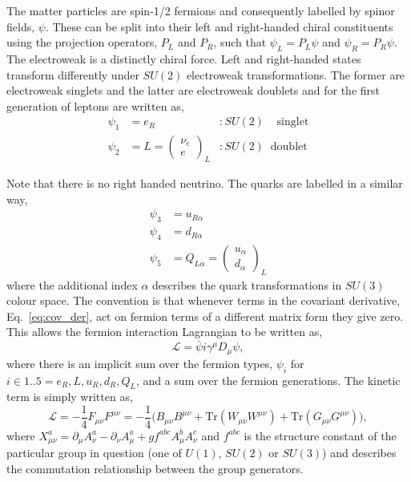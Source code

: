 The matter particles are spin-1/2 fermions and consequently labelled by spinor fields, $\psi$. These can be split into their left and right-handed chiral constituents using the projection operators, $P_{L}$ and $P_{R}$, such that $\psi_{L}=P_{L}\psi$ and $\psi_{R}=P_{R}\psi$.
The electroweak is a distinctly chiral force. Left and right-handed states transform differently under $SU(2)$ electroweak transformations. The former are electroweak singlets and the latter are electroweak doublets and for the first generation of leptons are written as,
\begin{align}
  \psi_{1} & = e_{R} &:SU(2)\;\;\;\;\mathrm{singlet} \\
  \psi_{2} & = L = \begin{pmatrix} \nu_{e} \\[-0.05cm] e \end{pmatrix}_{L} &:SU(2)\;\;\mathrm{doublet} 
\end{align}

Note that there is no right handed neutrino. The quarks are labelled in a similar way,
\begin{align}
  \psi_{3} & = u_{R\alpha} \\
  \psi_{4} & = d_{R\alpha} \\
  \psi_{5} & = Q_{L\alpha} = \begin{pmatrix} u_{\alpha} \\[-0.05cm] d_{\alpha} \end{pmatrix}_{L}  
\end{align}
where the additional index $\alpha$ describes the quark transformations in $SU(3)$ colour space. The convention is that whenever terms in the covariant derivative, Eq.~\ref{eq:cov_der}, act on fermion terms of a different matrix form they give zero. This allows the \SM fermion interaction Lagrangian to be written as,
\begin{equation}
  \mathcal{L} = \bar{\psi}i\gamma^{\mu}D_{\mu}\psi,
\end{equation}
where there is an implicit sum over the fermion types, $\psi_{i}$ for $i\in{1..5}=e_{R}, L, u_{R}, d_{R}, Q_{L}$, and a sum over the fermion generations. The kinetic term is simply written as,
\begin{equation}
  \mathcal{L} = -\frac{1}{4}F_{\mu\nu}F^{\mu\nu} = -\frac{1}{4}\biggl( B_{\mu\nu}B^{\mu\nu} + \mathrm{Tr} (W_{\mu\nu}W^{\mu\nu}) + \mathrm{Tr} (G_{\mu\nu}G^{\mu\nu}) \biggr),
\end{equation}
where $X^{a}_{\mu\nu} = \partial_{\mu}A^{a}_{\nu}-\partial_{\nu}A^{a}_{\mu}+gf^{abc}A^{b}_{\mu}A^{c}_{\nu}$ and $f^{abc}$ is the structure constant of the particular group in question (one of $U(1)$, $SU(2)$ or $SU(3)$) and describes the commutation relationship between the group generators. %

